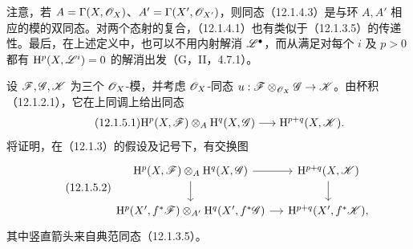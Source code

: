 注意，若 $A=\Gamma(X,\mathscr O_X)$、$A'=\Gamma(X',\mathscr O_{X'})$，则同态（12.1.4.3）是与环 $A,A'$ 相应的模的双同态。对两个态射的复合，（12.1.4.1）也有类似于（12.1.3.5）的传递性。最后，在上述定义中，也可以不用内射解消 $\mathscr L^\bullet$，而从满足对每个 $i$ 及 $p>0$ 都有 $\mathrm H^p(X,\mathscr L^i)=0$ 的解消出发（G，II，4.7.1）。

设 $\mathscr F,\mathscr G,\mathscr K$ 为三个 $\mathscr O_X$-模，并考虑 $\mathscr O_X$-同态 $u:\mathscr F\otimes_{\mathscr O_X}\mathscr G\to\mathscr K$。由杯积（12.1.2.1），它在上同调上给出同态
\begin{equation}\tag{12.1.5.1}
\mathrm H^p(X,\mathscr F)\otimes_A\mathrm H^q(X,\mathscr G)
\longrightarrow\mathrm H^{p+q}(X,\mathscr K).
\end{equation}
将证明，在（12.1.3）的假设及记号下，有交换图
\begin{equation}\tag{12.1.5.2}
\begin{tikzcd}[column sep=small]
\mathrm H^p(X,\F)\otimes_A\mathrm H^q(X,\G)\arrow[r]\arrow[d]&\mathrm H^{p+q}(X,\K)\arrow[d]\\
\mathrm H^p(X',f^*\F)\otimes_{A'}\mathrm H^q(X',f^*\G)\arrow[r]&\mathrm H^{p+q}(X',f^*\K),
\end{tikzcd}
\end{equation}
其中竖直箭头来自典范同态（12.1.3.5）。


